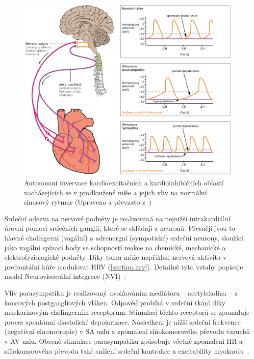 \begin{figure}[h]
	\begin{center}
		\includegraphics[width=1\textwidth]{../assets/anatomy/hr_regulation}
		\caption{Autonomní invervace kardioexcitačních a kardioinhibičních
			oblastí nacházejících se v prodloužené míše a jejich vliv na
			normální sinusový rytmus (Upraveno a převzato z~\cite{OpenStax})}
		\label{fig:hr_regulation}
	\end{center}
\end{figure}

Srdeční odezva na nervové podněty je realizovaná na nejnižší intrakardiální
úrovní pomocí srdečních ganglií, které se skládají z neuronů. Přesněji jsou to
hlavně cholingerní (vagální) a adrenergní (sympatické) srdeční neurony, sloužící
jako vagální spínací body se schopností reakce na chemické, mechanické a
elektrofyziologické podněty. Díky tomu může například nervová aktivita v
prefrontální kůře modulovat HRV (\ref{section:hrv}). Detailně tyto vztahy
popisuje model Neuroviscerální integrace (NVI)~\cite{Smith2017}.

Vliv parasympatiku je realizovaný uvolňováním mediátoru -- acetylcholinu -- z
koncových postgangliových vláken. Odpověď probíhá v srdeční tkání díky
muskarinovým cholingerním receptorům. Stimulací těchto receptorů se zpomaluje
proces spontánní diastolické depolarizace. Následkem je nižší srdeční frekvence
(negativní chronotropie) v SA uzlu a zpomalení síňokomorového převodu vzruchů v
AV uzlu. Obecně stimulace parasympatiku způsobuje včetně zpomalení HR a
síňokomorového převodu také snížení srdeční kontrakce a excitability
myokardu~\cite{Kittnar2020}.

